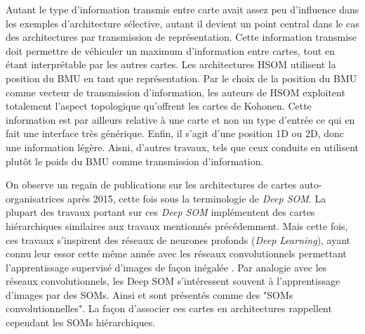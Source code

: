 \documentclass[../main]{subfiles}
\begin{document}
Autant le type d'information transmis entre carte avait assez peu d'influence dans les exemples d'architecture sélective, autant il devient un point central dans le cas des architectures par transmission de représentation. Cette information transmise doit permettre de véhiculer un maximum d'information entre cartes, tout en étant interprétable par les autres cartes. Les architectures HSOM utilisent la position du BMU en tant que représentation. Par le choix de la position du BMU comme vecteur de transmission d'information, les auteurs de HSOM exploitent totalement l'aspect topologique qu'offrent les cartes de Kohonen. Cette information est par ailleurs relative à une carte et non un type d'entrée ce qui en fait une interface très générique. Enfin, il s'agit d'une position 1D ou 2D, donc une information légère.
Aisni, d'autres travaux, tels que ceux conduits en \cite{wang_comparisonal_2007, gunes_kayacik_hierarchical_2007} utilisent plutôt le poids du BMU comme transmission d'information.


On observe un regain de publications sur les architectures de cartes auto-organisatrices après 2015, cette fois sous la terminologie de \emph{Deep SOM}.
La plupart des travaux portant sur ces \emph{Deep SOM} implémentent des cartes hiérarchiques similaires aux travaux mentionnés précédemment. 
Mais cette fois, ces travaux s'inspirent des réseaux de neurones profonds (\emph{Deep Learning}), ayant connu leur essor cette même année avec les réseaux convolutionnels permettant l'apprentissage supervisé d'images de façon inégalée \cite{lecun_deep_2015}.
Par analogie avec les réseaux convolutionnels, les Deep SOM s'intéressent souvent à l'apprentissage d'images par des SOMs. Ainsi \cite{Liu2015DeepSM,hankins_somnet_2018,wickramasinghe_deep_2019,aly_deep_2020,sakkari_convolutional_2020,dozono_convolutional_2016,nawaratne_hierarchical_2020-1,mici_self-organizing_2018} et sont présentés comme des "SOMs convolutionnelles". La façon d'associer ces cartes en architectures rappellent cependant les SOMs hiérarchiques.
\end{document}
